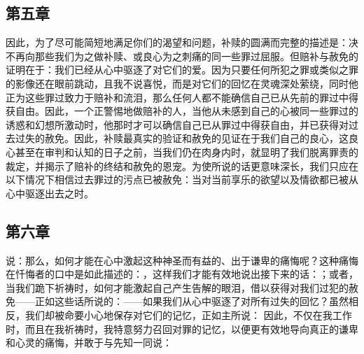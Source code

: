 
\subsection{第五章}

\par

因此，为了尽可能简短地满足你们的渴望和问题，补赎的圆满而完整的描述是：决不再向那些我们为之做补赎、或良心为之刺痛的同一些罪过屈服。但赔补与赦免的证明在于：我们已经从心中驱逐了对它们的爱。因为只要任何所犯之罪或类似之罪的影像还在眼前跳动，且我不说喜悦，而是对它们的回忆在灵魂深处萦绕，同时他正为这些罪过致力于赔补和流泪，那么任何人都不能确信自己已从先前的罪过中得获自由。因此，一个正警惕地做赔补的人，当他从未感到自己的心被同一些罪过的诱惑和幻想所激动时，他那时才可以确信自己已从罪过中得获自由，并已获得对过去过失的赦免。因此，补赎最真实的验证和赦免的见证在于我们自己的良心，这良心甚至在审判和认知的日子之前，当我们仍在肉身内时，就显明了我们脱离罪责的裁定，并揭示了赔补的终结和赦免的恩宠。为使所说的话更意味深长，我们只应在以下情况下相信过去罪过的污点已被赦免：当对当前享乐的欲望以及情欲都已被从心中驱逐出去之时。\par


\subsection{第六章}

\par

说：那么，如何才能在心中激起这种神圣而有益的、出于谦卑的痛悔呢？这种痛悔在忏悔者的口中是如此描述的：，这样我们才能有效地说出接下来的话：；或者，当我们跪下祈祷时，如何才能激起自己产生告解的眼泪，借以获得对我们过犯的赦免——正如这些话所说的：——如果我们从心中驱逐了对所有过失的回忆？虽然相反，我们却被命要小心地保存对它们的记忆，正如主所说：  因此，不仅在我工作时，而且在我祈祷时，我特意努力召回对罪的记忆，以便更有效地导向真正的谦卑和心灵的痛悔，并敢于与先知一同说：\par

